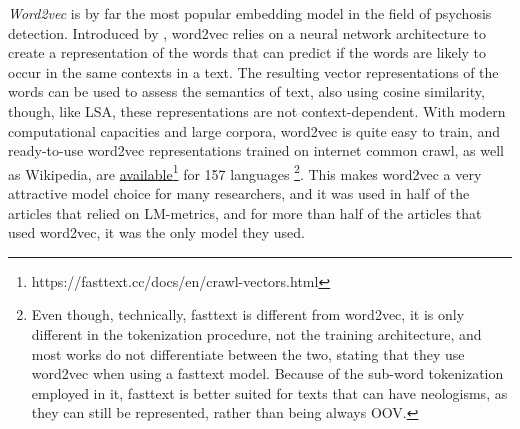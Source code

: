 \textit{Word2vec} is by far the most popular embedding model in the field of psychosis detection. Introduced by \citet{mikolov2013distributed}, word2vec relies on a neural network architecture to create a representation of the words that can predict if the words are likely to occur in the same contexts in a text. The resulting vector representations of the words can be used to assess the semantics of text, also using cosine similarity, though, like LSA, these representations are not context-dependent. With modern computational capacities and large corpora, word2vec is quite easy to train, and ready-to-use word2vec representations trained on internet common crawl, as well as Wikipedia, are \href{https://fasttext.cc/docs/en/crawl-vectors.html}{available}\footnote{https://fasttext.cc/docs/en/crawl-vectors.html} for 157 languages \citep{bojanowski2017enriching}\footnote{Even though, technically, fasttext is different from word2vec, it is only different in the tokenization procedure, not the training architecture, and most works do not differentiate between the two, stating that they use word2vec when using a fasttext model. Because of the sub-word tokenization employed in it, fasttext is better suited for texts that can have neologisms, as they can still be represented, rather than being always OOV.}. This makes word2vec a very attractive model choice for many researchers, and it was used in half of the articles that relied on LM-metrics, and for more than half of the articles that used word2vec, it was the only model they used. 


